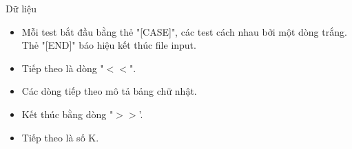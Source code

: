 Dữ liệu
\begin{itemize}
	\item     Mỗi test bắt đầu bằng thẻ "[CASE]", các test cách nhau bởi một dòng trắng. Thẻ "[END]" báo hiệu kết thúc file input.   
	\item     Tiếp theo là dòng "$<$$<$".   
	\item     Các dòng tiếp theo mô tả bảng chữ nhật.   
	\item     Kết thúc bằng dòng "$>$$>$'.   
	\item     Tiếp theo là số K.   
\end{itemize}